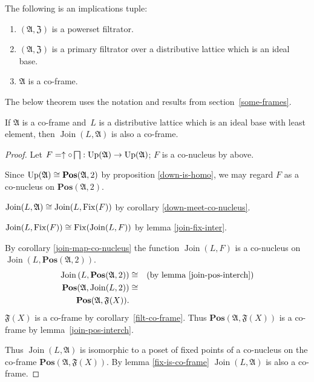 \begin{cor}\label{filt-co-frame}
The following is an implications tuple:
\begin{enumerate}
\item $(\mathfrak{A},\mathfrak{Z})$ is a powerset filtrator.
\item $(\mathfrak{A},\mathfrak{Z})$ is a primary filtrator over a distributive
lattice which is an ideal base.
\item $\mathfrak{A}$ is a co-frame.
\end{enumerate}
\end{cor}

The below theorem uses the notation and results from section~\ref{some-frames}.
\begin{thm}
\label{frame-main}If $\mathfrak{A}$ is a co-frame and~$L$ is a
distributive lattice which is an ideal base with
least element, then $\operatorname{Join}(L,\mathfrak{A})$
is also a co-frame.
\end{thm}
\begin{proof}
Let $F=\uparrow\circ\bigsqcap:\operatorname{Up}(\mathfrak{A})\rightarrow\operatorname{Up}(\mathfrak{A})$;
$F$ is a co-nucleus by above.

Since $\operatorname{Up}(\mathfrak{A})\cong\mathbf{Pos}(\mathfrak{A},2)$ by
proposition \ref{down-is-homo}, we may regard $F$ as a co-nucleus
on $\mathbf{Pos}(\mathfrak{A},2)$.

$\operatorname{Join}(L,\mathfrak{A})\cong\operatorname{Join}(L,\operatorname{Fix}(F))$
by corollary \ref{down-meet-co-nucleus}.

$\operatorname{Join}(L,\operatorname{Fix}(F))\cong\operatorname{Fix}(\operatorname{Join}(L,F))$
by lemma \ref{join-fix-inter}.

By corollary \ref{join-map-co-nucleus} the function $\operatorname{Join}(L,F)$
is a co-nucleus on $\operatorname{Join}\left(L,\mathbf{Pos}(\mathfrak{A},2)\right)$.
\begin{eqnarray*}
\operatorname{Join}\left(L,\mathbf{Pos}(\mathfrak{A},2)\right) & \cong & \text{(by lemma \ref{join-pos-interch})}\\
\mathbf{Pos}(\mathfrak{A},\operatorname{Join}(L,2)) & \cong\\
\mathbf{Pos}(\mathfrak{A},\mathfrak{F}(X)).
\end{eqnarray*}
$\mathfrak{F}(X)$ is a co-frame by corollary~\ref{filt-co-frame}. Thus
$\mathbf{Pos}(\mathfrak{A},\mathfrak{F}(X))$ is a co-frame by lemma~\ref{join-pos-interch}.

Thus $\operatorname{Join}(L,\mathfrak{A})$ is isomorphic to a poset
of fixed points of a co-nucleus on the co-frame $\mathbf{Pos}(\mathfrak{A},\mathfrak{F}(X))$.
By lemma \ref{fix-is-co-frame} $\operatorname{Join}(L,\mathfrak{A})$
is also a co-frame.
\end{proof}

